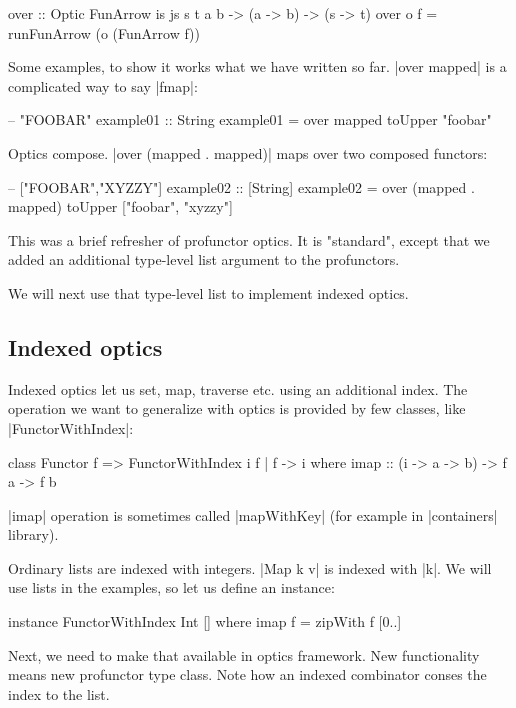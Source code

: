 \begin{code}
over :: Optic FunArrow is js s t a b
     -> (a -> b)
     -> (s -> t)
over o f = runFunArrow (o (FunArrow f))
\end{code}

Some examples, to show it works what we have written so far.
|over mapped| is a complicated way to say |fmap|:

\begin{code}
-- "FOOBAR"
example01 :: String
example01 = over mapped toUpper "foobar"
\end{code}
 
Optics compose. |over (mapped . mapped)| maps over two composed functors:

\begin{code}
-- ["FOOBAR","XYZZY"]
example02 :: [String]
example02 = over (mapped . mapped) toUpper ["foobar", "xyzzy"]
\end{code}

This was a brief refresher of profunctor optics.
It is "standard", except that we added an additional
type-level list argument to the profunctors.

We will next use that type-level list to implement indexed optics.

\subsection{Indexed optics}

Indexed optics let us set, map, traverse etc. using an additional index.
The operation we want to generalize with optics is provided
by few classes, like |FunctorWithIndex|:

\begin{code}
class Functor f => FunctorWithIndex i f | f -> i where
    imap :: (i -> a -> b) -> f a -> f b
\end{code}

|imap| operation is sometimes called |mapWithKey| (for example
in |containers| library).  

Ordinary lists are indexed with integers. |Map k v| is indexed with |k|.
We will use lists in the examples, so let us define an instance:

\begin{code}
instance FunctorWithIndex Int [] where
    imap f = zipWith f [0..]
\end{code}

Next, we need to make that available in optics framework.
New functionality means new profunctor type class.
Note how an indexed combinator conses the index to the list.

